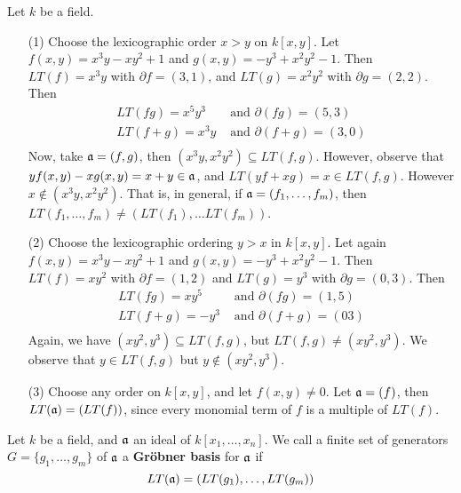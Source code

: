 \begin{example}\label{example_7.8}
  Let $k$ be a field.
  \begin{enumerate}
    \item[(1)] Choose the lexicographic order $x>y$ on $k[x,y]$. Let
      $f(x,y)=x^3y-xy^2+1$ and $g(x,y)=-y^3+x^2y^2-1$. Then
      $LT(f)=x^3y$ with $\partial{f}=(3,1)$, and $LT(g)=x^2y^2$ with
      $\partial{g}=(2,2)$. Then
      \begin{align*}
        LT(fg)=x^5y^3 & \text{ and } \partial{(fg)}=(5,3) \\
        LT(f+g)=x^3y  & \text{ and } \partial{(f+g)}=(3,0)  \\
      \end{align*}
      Now, take $\mathfrak{a}=(f,g)$, then $(x^3y,x^2y^2) \subseteq LT(f,g)$.
      However, observe that $yf(x,y)-xg(x,y)=x+y \in \mathfrak{a}$, and
      $LT(yf+xg)=x \in LT(f,g)$. However $x \notin
      (x^3y,x^2y^2)$. That is, in general, if $\mathfrak{a}=(f_1,
      \dots, f_m)$, then $LT(f_1, \dots, f_m) \neq (LT(f_1), \dots
      LT(f_m))$.

    \item[(2)] Choose the lexicographic ordering $y>x$ in  $k[x,y]$.
      Let again $f(x,y)=x^3y-xy^2+1$ and $g(x,y)=-y^3+x^2y^2-1$. Then
      $LT(f)=xy^2$ with $\partial{f}=(1,2)$ and $LT(g)=y^3$ with
      $\partial{g}=(0,3)$. Then
      \begin{align*}
        LT(fg)=xy^5 & \text{ and } \partial{(fg)}=(1,5) \\
        LT(f+g)=-y^3 & \text{ and } \partial{(f+g)}=(03) \\
      \end{align*}
      Again, we have $(xy^2, y^3) \subseteq LT(f,g)$, but $LT(f,g)
      \neq (xy^2,y^3)$. We observe that $y \in LT(f,g)$ but $y \notin
      (xy^2,y^3)$.

    \item[(3)] Choose any order on $k[x,y]$, and let $f(x,y) \neq 0$.
      Let $\mathfrak{a}=(f)$, then $LT(\mathfrak{a})=(LT(f))$, since every monomial term
      of $f$ is a multiple of  $LT(f)$.
  \end{enumerate}
\end{example}

\begin{definition}
  Let $k$ be a field, and $\mathfrak{a}$ an ideal of $k[x_1, \dots, x_n]$. We
  call a finite set of generators $G=\{g_1, \dots, g_m\}$ of $\mathfrak{a}$ a
  \textbf{Gr\"obner basis} for $\mathfrak{a}$ if
  \begin{equation*}
    LT(\mathfrak{a})=(LT(g_1), \dots, LT(g_m))
  \end{equation*}
\end{definition}
